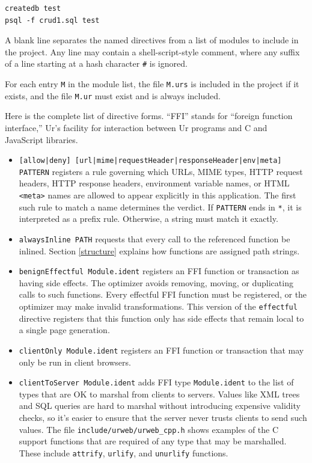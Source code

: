 \documentclass{article}
\begin{document}
\begin{verbatim}
createdb test
psql -f crud1.sql test
\end{verbatim}

A blank line separates the named directives from a list of modules to include in the project.  Any line may contain a shell-script-style comment, where any suffix of a line starting at a hash character \texttt{\#} is ignored.

For each entry \texttt{M} in the module list, the file \texttt{M.urs} is included in the project if it exists, and the file \texttt{M.ur} must exist and is always included.

Here is the complete list of directive forms.  ``FFI'' stands for ``foreign function interface,'' Ur's facility for interaction between Ur programs and C and JavaScript libraries.
\begin{itemize}
\item \texttt{[allow|deny] [url|mime|requestHeader|responseHeader|env|meta] PATTERN} registers a rule governing which URLs, MIME types, HTTP request headers, HTTP response headers, environment variable names, or HTML \texttt{<meta>} names are allowed to appear explicitly in this application.  The first such rule to match a name determines the verdict.  If \texttt{PATTERN} ends in \texttt{*}, it is interpreted as a prefix rule.  Otherwise, a string must match it exactly.
\item \texttt{alwaysInline PATH} requests that every call to the referenced function be inlined.  Section \ref{structure} explains how functions are assigned path strings.
\item \texttt{benignEffectful Module.ident} registers an FFI function or transaction as having side effects.  The optimizer avoids removing, moving, or duplicating calls to such functions.  Every effectful FFI function must be registered, or the optimizer may make invalid transformations.  This version of the \texttt{effectful} directive registers that this function only has side effects that remain local to a single page generation.
\item \texttt{clientOnly Module.ident} registers an FFI function or transaction that may only be run in client browsers.
\item \texttt{clientToServer Module.ident} adds FFI type \texttt{Module.ident} to the list of types that are OK to marshal from clients to servers.  Values like XML trees and SQL queries are hard to marshal without introducing expensive validity checks, so it's easier to ensure that the server never trusts clients to send such values.  The file \texttt{include/urweb/urweb\_cpp.h} shows examples of the C support functions that are required of any type that may be marshalled.  These include \texttt{attrify}, \texttt{urlify}, and \texttt{unurlify} functions.

\end{itemize}
\end{document}

